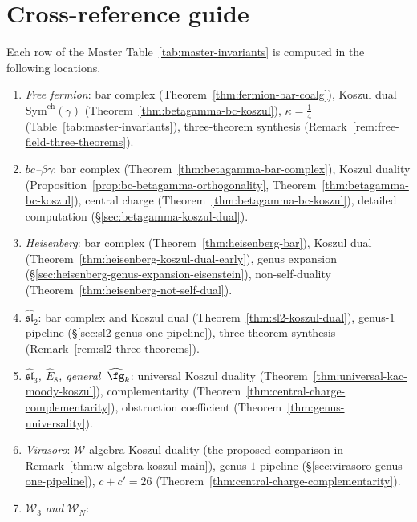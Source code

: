 \section*{Cross-reference guide}
\label{sec:cross-ref-guide}

\begin{remark}\label{rem:cross-ref-guide}
Each row of the Master Table~\textup{\ref{tab:master-invariants}} is
computed in the following locations.
\begin{enumerate}
\item \emph{Free fermion}:
  bar complex (Theorem~\ref{thm:fermion-bar-coalg}),
  Koszul dual $\mathrm{Sym}^{\mathrm{ch}}(\gamma)$
  (Theorem~\ref{thm:betagamma-bc-koszul}),
  $\kappa = \tfrac{1}{4}$ (Table~\ref{tab:master-invariants}),
  three-theorem synthesis
  (Remark~\ref{rem:free-field-three-theorems}).
\item \emph{$bc$--$\beta\gamma$}:
  bar complex (Theorem~\ref{thm:betagamma-bar-complex}),
  Koszul duality
  (Proposition~\ref{prop:bc-betagamma-orthogonality},
  Theorem~\ref{thm:betagamma-bc-koszul}),
  central charge (Theorem~\ref{thm:betagamma-bc-koszul}),
  detailed computation (\S\ref{sec:betagamma-koszul-dual}).
\item \emph{Heisenberg}:
  bar complex (Theorem~\ref{thm:heisenberg-bar}),
  Koszul dual (Theorem~\ref{thm:heisenberg-koszul-dual-early}),
  genus expansion
  (\S\ref{sec:heisenberg-genus-expansion-eisenstein}),
  non-self-duality (Theorem~\ref{thm:heisenberg-not-self-dual}).
\item \emph{$\widehat{\mathfrak{sl}}_2$}:
  bar complex and Koszul dual
  (Theorem~\ref{thm:sl2-koszul-dual}),
  genus-$1$ pipeline (\S\ref{sec:sl2-genus-one-pipeline}),
  three-theorem synthesis (Remark~\ref{rem:sl2-three-theorems}).
\item \emph{$\widehat{\mathfrak{sl}}_3$, $\widehat{E}_8$,
  general~$\widehat{\fg}_k$}:
  universal Koszul duality
  (Theorem~\ref{thm:universal-kac-moody-koszul}),
  complementarity
  (Theorem~\ref{thm:central-charge-complementarity}),
  obstruction coefficient
  (Theorem~\ref{thm:genus-universality}).
\item \emph{Virasoro}:
  $\mathcal{W}$-algebra Koszul duality
  (the proposed comparison in Remark~\ref{thm:w-algebra-koszul-main}),
  genus-$1$ pipeline (\S\ref{sec:virasoro-genus-one-pipeline}),
  $c + c' = 26$
  (Theorem~\ref{thm:central-charge-complementarity}).
\item \emph{$\mathcal{W}_3$ and $\mathcal{W}_N$}:

\end{enumerate}
\end{remark}
